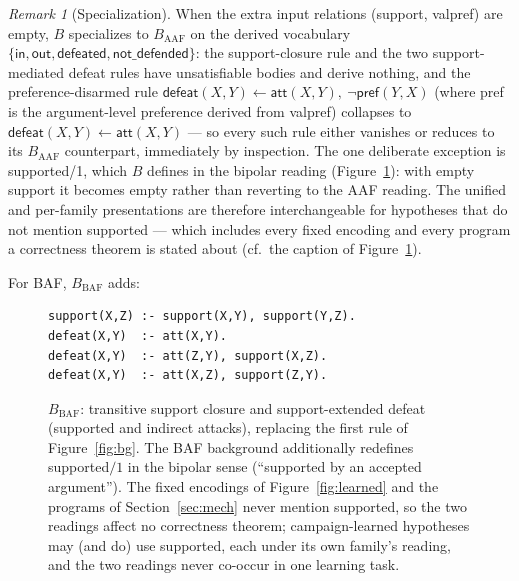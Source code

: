 \documentclass[review,12pt]{elsarticle}
\theoremstyle{definition}
\theoremstyle{remark}
\newtheorem{remark}{Remark}
\newcommand{\pred}[1]{\textsf{#1}}
\begin{document}
\begin{remark}[Specialization]
\label{rem:spec}
When the extra input relations (\pred{support}, \pred{valpref}) are empty, $B$
specializes to $B_{\mathrm{AAF}}$ on the derived vocabulary
$\{\pred{in},\pred{out},\pred{defeated},\pred{not\_defended}\}$: the
support-closure rule and the two support-mediated defeat rules have
unsatisfiable bodies and derive nothing, and the preference-disarmed rule
$\pred{defeat}(X,Y)\leftarrow\pred{att}(X,Y),\ \neg\pred{pref}(Y,X)$ (where
\pred{pref} is the argument-level preference derived from \pred{valpref})
collapses to $\pred{defeat}(X,Y)\leftarrow\pred{att}(X,Y)$ --- so every such
rule either vanishes or reduces to its $B_{\mathrm{AAF}}$ counterpart,
immediately by inspection. The one deliberate exception is \pred{supported}/1,
which $B$ defines in the bipolar reading (Figure~\ref{fig:bgbaf}): with empty
\pred{support} it becomes empty rather than reverting to the AAF reading.
The unified and per-family presentations are therefore interchangeable for
hypotheses that do not mention \pred{supported} --- which includes every fixed
encoding and every program a correctness theorem is stated about (cf.\ the
caption of Figure~\ref{fig:bgbaf}).
\end{remark}

\noindent For BAF, $B_{\mathrm{BAF}}$ adds:

\begin{figure}[h]
\centering
\small
\begin{minipage}{0.72\linewidth}
\begin{verbatim}
support(X,Z) :- support(X,Y), support(Y,Z).
defeat(X,Y)  :- att(X,Y).
defeat(X,Y)  :- att(Z,Y), support(X,Z).
defeat(X,Y)  :- att(X,Z), support(Z,Y).
\end{verbatim}
\end{minipage}
\caption{$B_{\mathrm{BAF}}$: transitive support closure and support-extended
defeat (supported and indirect attacks), replacing the first rule of
Figure~\ref{fig:bg}. The BAF background additionally redefines
\pred{supported}$/1$ in the bipolar sense (``supported by an accepted
argument''). The fixed encodings of Figure~\ref{fig:learned} and the programs
of Section~\ref{sec:mech} never mention \pred{supported}, so the two
readings affect no correctness theorem; campaign-learned hypotheses may (and
do) use \pred{supported}, each under its own family's reading, and the two
readings never co-occur in one learning task.}
\label{fig:bgbaf}
\end{figure}
\end{document}
